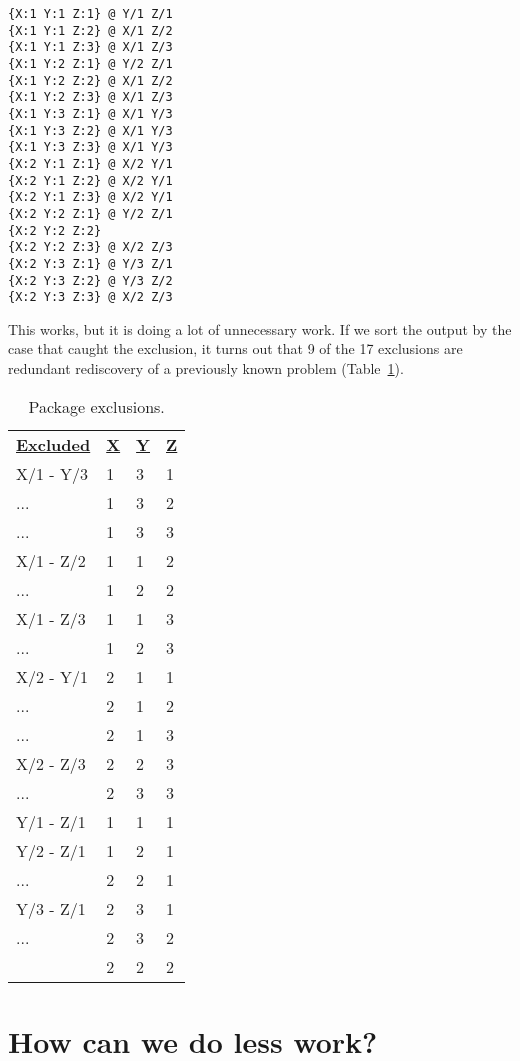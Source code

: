 \documentclass[krantzl]{krantz}
\newcommand{\tblref}[1]{Table~\ref{#1}}
\begin{document}
\begin{lstlisting}[frame=tblr,backgroundcolor=\color{black!5}]
{X:1 Y:1 Z:1} @ Y/1 Z/1
{X:1 Y:1 Z:2} @ X/1 Z/2
{X:1 Y:1 Z:3} @ X/1 Z/3
{X:1 Y:2 Z:1} @ Y/2 Z/1
{X:1 Y:2 Z:2} @ X/1 Z/2
{X:1 Y:2 Z:3} @ X/1 Z/3
{X:1 Y:3 Z:1} @ X/1 Y/3
{X:1 Y:3 Z:2} @ X/1 Y/3
{X:1 Y:3 Z:3} @ X/1 Y/3
{X:2 Y:1 Z:1} @ X/2 Y/1
{X:2 Y:1 Z:2} @ X/2 Y/1
{X:2 Y:1 Z:3} @ X/2 Y/1
{X:2 Y:2 Z:1} @ Y/2 Z/1
{X:2 Y:2 Z:2}
{X:2 Y:2 Z:3} @ X/2 Z/3
{X:2 Y:3 Z:1} @ Y/3 Z/1
{X:2 Y:3 Z:2} @ Y/3 Z/2
{X:2 Y:3 Z:3} @ X/2 Z/3
\end{lstlisting}



This works,
but it is doing a lot of unnecessary work.
If we sort the output by the case that caught the exclusion,
it turns out that 9 of the 17 exclusions are redundant rediscovery of a previously known problem
(\tblref{package-manager-exclusions}).

\begin{table}
\begin{tabular}{llll}
\textbf{\underline{Excluded}} & \textbf{\underline{X}} & \textbf{\underline{Y}} & \textbf{\underline{Z}} \\
X/1 - Y/3 & 1 & 3 & 1 \\
... & 1 & 3 & 2 \\
... & 1 & 3 & 3 \\
X/1 - Z/2 & 1 & 1 & 2 \\
... & 1 & 2 & 2 \\
X/1 - Z/3 & 1 & 1 & 3 \\
... & 1 & 2 & 3 \\
X/2 - Y/1 & 2 & 1 & 1 \\
... & 2 & 1 & 2 \\
... & 2 & 1 & 3 \\
X/2 - Z/3 & 2 & 2 & 3 \\
... & 2 & 3 & 3 \\
Y/1 - Z/1 & 1 & 1 & 1 \\
Y/2 - Z/1 & 1 & 2 & 1 \\
... & 2 & 2 & 1 \\
Y/3 - Z/1 & 2 & 3 & 1 \\
... & 2 & 3 & 2 \\
 & 2 & 2 & 2 \\
\end{tabular}
\caption{Package exclusions.}
\label{package-manager-exclusions}
\end{table}


\section{How can we do less work?}\label{package-manager-optimize}
\end{document}

